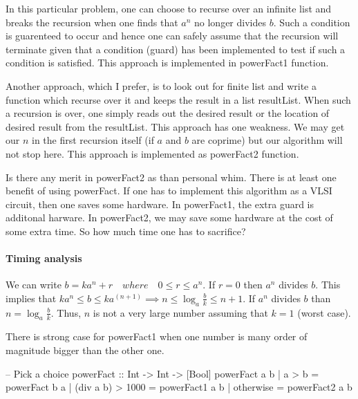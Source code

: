 \documentclass{report}%
\begin{document}
In this particular problem, one can choose to recurse over an infinite
list and breaks the recursion when one finds that $a^n$ no longer
divides $b$. Such a condition is guarenteed to occur and hence one can
safely assume that the recursion will terminate given that a condition
(guard) has been implemented to test if such a condition is satisfied.
This approach is implemented in {\Tt{}powerFact1\nwendquote} function.


Another approach, which I prefer, is to look out for finite list and
write a function which recurse over it and keeps the result in a list
{\Tt{}resultList\nwendquote}. When such a recursion is over, one simply reads out
the desired result or the location of desired result from the
{\Tt{}resultList\nwendquote}. This approach has one weakness. We may get our $n$ in
the first recursion itself (if $a$ and $b$ are coprime) but our
algorithm will not stop here. This approach is implemented as
{\Tt{}powerFact2\nwendquote} function.


Is there any merit in {\Tt{}powerFact2\nwendquote} as than personal whim. There is
at least one benefit of using {\Tt{}powerFact\nwendquote}. If one has to implement
this algorithm as a VLSI circuit, then one saves some hardware. In
{\Tt{}powerFact1\nwendquote}, the extra guard is additonal harware. In
{\Tt{}powerFact2\nwendquote}, we may save some hardware at the cost of some extra
time. So how much time one has to sacrifice?

\paragraph{Timing analysis} We can write $ b = k a^n + r \quad where
\quad 0 \leq r \le a^n $. If $r =0 $ then $a^n$ divides $b$. This
implies that $k a^n \leq b \le k a^(n+1) \implies n \le \log_a
\frac{b}{k} \le n+1 $. If $a^n$ divides $b$ than $ n =
\log_a\frac{b}{k}$. Thus, $n$ is not a very large number assuming that
$k=1$ (worst case).

There is strong case for {\Tt{}powerFact1\nwendquote} when one number is many order
of magnitude bigger than the other one.

\nwenddocs{}\endmoddef\nwstartdeflinemarkup\nwenddeflinemarkup

-- Pick a choice
powerFact :: Int -> Int ->  [Bool]
powerFact a b | a > b = powerFact b a
              | (div a b) > 1000 = powerFact1 a b
              | otherwise = powerFact2 a b


\nwendcode{}\nwdocspar
\end{document}
